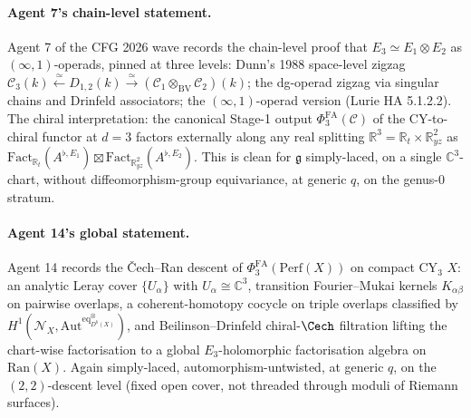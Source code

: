 \documentclass[11pt]{article}
\newcommand{\Eone}{E_{1}}
\newcommand{\Etwo}{E_{2}}
\newcommand{\Ethree}{E_{3}}
\newcommand{\PhiFA}{\Phi^{\mathrm{FA}}}
\newcommand{\Cube}{\mathscr{C}}
\newcommand{\Ran}{\mathrm{Ran}}
\newcommand{\R}{\mathbb{R}}
\newcommand{\C}{\mathbb{C}}
\newcommand{\cC}{\mathcal{C}}
\newcommand{\cN}{\mathcal{N}}
\newcommand{\Perf}{\mathrm{Perf}}
\newcommand{\Auteq}{\mathrm{Aut}^{\mathrm{eq}}}
\newcommand{\frakg}{\mathfrak{g}}
\begin{document}
\paragraph{Agent 7's chain-level statement.}
Agent 7 of the CFG 2026 wave records the chain-level proof that
$\Ethree \simeq \Eone \otimes \Etwo$ as $(\infty,1)$-operads, pinned
at three levels: Dunn's 1988 space-level zigzag
$\Cube_3(k) \xleftarrow{\simeq} D_{1,2}(k) \xrightarrow{\simeq}
(\Cube_1 \otimes_{\mathrm{BV}} \Cube_2)(k)$; the dg-operad zigzag via
singular chains and Drinfeld associators; the $(\infty,1)$-operad
version (Lurie HA 5.1.2.2). The chiral interpretation: the canonical
Stage-1 output $\PhiFA_3(\cC)$ of the CY-to-chiral functor at $d = 3$
factors externally along any real splitting $\R^3 = \R_t \times
\R^2_{yz}$ as $\mathrm{Fact}_{\R_t}(A^{\flat,\Eone}) \boxtimes
\mathrm{Fact}_{\R^2_{yz}}(A^{\flat,\Etwo})$. This is clean for
$\frakg$ simply-laced, on a single $\C^3$-chart, without
diffeomorphism-group equivariance, at generic $q$, on the genus-$0$
stratum.

\paragraph{Agent 14's global statement.}
Agent 14 records the \v{C}ech--Ran descent of $\PhiFA_3(\Perf(X))$ on
compact CY$_3$ $X$: an analytic Leray cover
$\{U_\alpha\}$ with $U_\alpha \cong \C^3$, transition
Fourier--Mukai kernels $K_{\alpha\beta}$ on pairwise overlaps, a
coherent-homotopy cocycle on triple overlaps classified by
$H^1(\cN_X, \Auteq^{\otimes}_{D^b(X)})$, and Beilinson--Drinfeld
chiral-$\Cech$ filtration lifting the chart-wise factorisation to a
global $E_3$-holomorphic factorisation algebra on $\Ran(X)$. Again
simply-laced, automorphism-untwisted, at generic $q$, on the
$(2, 2)$-descent level (fixed open cover, not threaded through moduli
of Riemann surfaces).
\end{document}
